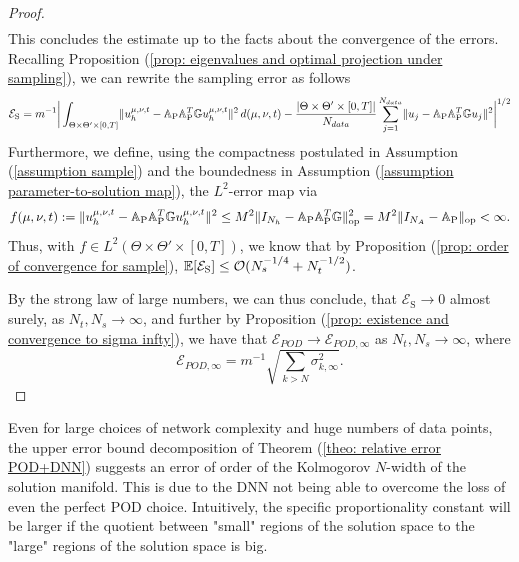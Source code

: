 \begin{proof}
\begin{align*}
    \end{align*}
    This concludes the estimate up to the facts about the convergence of the errors. Recalling
    Proposition (\ref{prop: eigenvalues and optimal projection under sampling}), 
    we can rewrite the sampling error as follows
    \begin{equation*}
        \mathcal{E}_\text{S} = m^{-1} 
        \bigg| \int_{\Theta \times \Theta' \times [0, T]} 
        \lVert u_h^{\mu, \nu, t} - \mathbb{A}_\text{P} \mathbb{A}_\text{P}^T \mathbb{G} u_h^{\mu, \nu, t} \rVert^2 \, d(\mu, \nu, t) \\
        - \frac{|\Theta \times \Theta' \times [0, T]|}{N_{data}} 
        \sum_{j=1}^{N_{data}} \lVert u_j - \mathbb{A}_\text{P} \mathbb{A}_\text{P}^T \mathbb{G} u_j \rVert^2 \bigg|^{1/2}
    \end{equation*}
    Furthermore, we define, using the compactness postulated in Assumption (\ref{assumption sample}) and 
    the boundedness in Assumption (\ref{assumption parameter-to-solution map}), the $L^2$-error map via
    \begin{equation*}
        f(\mu, \nu, t) := \lVert u_h^{\mu, \nu, t} - \mathbb{A}_\text{P} \mathbb{A}_\text{P}^T \mathbb{G} u_h^{\mu, \nu, t} \rVert^2 \leq M^2 \lVert I_{N_h} - \mathbb{A}_\text{P} \mathbb{A}_\text{P}^T \mathbb{G} \rVert_\text{op}^2 = 
        M^2 \lVert I_{N_A} - \mathbb{A}_\text{P} \rVert_\text{op} < \infty.
    \end{equation*}
    Thus, with $f \in L^2(\Theta \times \Theta' \times [0, T])$, we know that by Proposition 
    (\ref{prop: order of convergence for sample}), $\mathbb{E}[\mathcal{E}_\text{S}] \leq \mathcal{O}(N_s^{-1/4} + N_t^{-1/2})$.
    
    By the strong law of large numbers, we can thus conclude, that $\mathcal{E}_\text{S} \to 0$ almost surely, 
    as $N_t, N_s \to \infty$, and further by Proposition (\ref{prop: existence and convergence to sigma infty}), 
    we have that $\mathcal{E}_{POD} \to \mathcal{E}_{POD, \infty}$ as $N_t, N_s \to \infty$, where
    \begin{equation} \label{eq: pod eigenvalues cts case}
        \mathcal{E}_{POD, \infty} = m^{-1} \sqrt{\sum_{k > N} \sigma_{k, \infty}^2}.
    \end{equation}
\end{proof}

Even for large choices of network complexity
and huge numbers of data points, the upper error bound 
decomposition of Theorem (\ref{theo: relative error POD+DNN}) suggests an error of order of the 
Kolmogorov $N$-width of the solution manifold. This is due to the DNN not being able to overcome the loss of
even the perfect POD choice. Intuitively, the specific proportionality constant will be larger if the 
quotient between "small" regions of the solution space to the "large" regions of the solution space is big.

